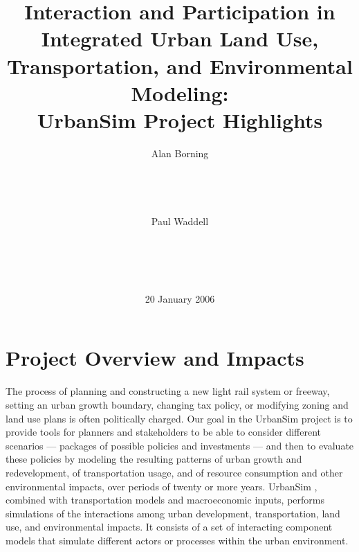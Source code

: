 \documentclass{acm_proc_article-sp}
\begin{document}
\title{Interaction and Participation in Integrated Urban Land Use,
Transportation, and Environmental Modeling: \\
UrbanSim Project Highlights}


\author{
\alignauthor Alan Borning\\
       \\
       \\
       \\
       \\
\alignauthor Paul Waddell\\
       \\
       \\
       \\
       \\
}
\date{20 January 2006}
\maketitle

\section{Project Overview and Impacts}

The process of planning and constructing a new light rail system
or freeway, setting an urban growth boundary, changing tax policy,
or modifying zoning and land use plans is often politically
charged.  Our goal in the UrbanSim project is to provide tools for
planners and stakeholders to be able to consider different
scenarios --- packages of possible policies and investments ---
and then to evaluate these policies by modeling the resulting
patterns of urban growth and redevelopment, of transportation
usage, and of resource consumption and other environmental
impacts, over periods of twenty or more years.  UrbanSim
\cite{waddell-nse-2003,waddell-ulfarsson-2004}, combined with
transportation models and macroeconomic inputs, performs
simulations of the interactions among urban development,
transportation, land use, and environmental impacts. It consists
of a set of interacting component models that simulate different
actors or processes within the urban environment.
\end{document}
